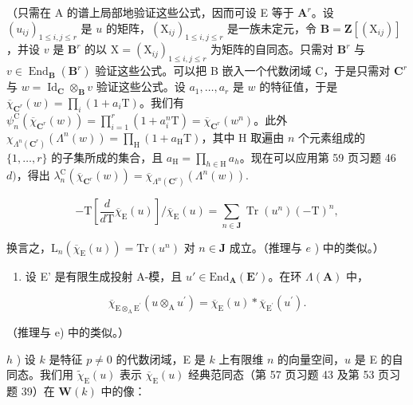 （只需在 A 的谱上局部地验证这些公式，因而可设 E 等于 \(\mathbf{A}^r\)。设 \((u_{ij})_{1\leqslant i,j\leqslant r}\) 是 \(u\) 的矩阵，\((\mathrm{X}_{ij})_{1\leqslant i,j\leqslant r}\) 是一族未定元，令 \(\mathbf{B} = \mathbf{Z}[(\mathrm{X}_{ij})]\)，并设 \(v\) 是 \(\mathbf{B}^r\) 的以 \(\mathrm{X} = (\mathrm{X}_{ij})_{1\leqslant i,j\leqslant r}\) 为矩阵的自同态。只需对 \(\mathbf{B}^r\) 与 \(v\in \operatorname {End}_{\mathbf{B}}(\mathbf{B}^r)\) 验证这些公式。可以把 B 嵌入一个代数闭域 C，于是只需对 \(\mathbf{C}^r\) 与 \(w = \operatorname {Id}_{\mathbf{C}}\otimes_{\mathbf{B}}v\) 验证这些公式。设 \(a_1,\dots,a_r\) 是 \(w\) 的特征值，于是 \(\overline{\chi}_{\mathbf{C}^r}(w) = \prod_i(1 + a_i\mathrm{T})\)。我们有 \(\psi_n^{\mathrm{C}}(\overline{\chi}_{\mathbf{C}^r}(w)) = \prod_{i = 1}^{r}(1 + a_i^n\mathrm{T}) = \overline{\chi}_{\mathbf{C}^r}(w^n)\)。此外 \(\chi_{\Lambda^n (\mathbf{C}^r)}(\Lambda^n (w)) = \prod_{\mathrm{H}}(1 + a_{\mathrm{H}}\mathrm{T})\)，其中 H 取遍由 \(n\) 个元素组成的 \(\{1,\dots,r\}\) 的子集所成的集合，且 \(a_{\mathrm{H}} = \prod_{h\in \mathrm{H}}a_h\)。现在可以应用第 59 页习题 46 \(d)\)，得出 \(\lambda_n^{\mathrm{C}}(\overline{\chi}_{\mathbf{C}^r}(w)) = \overline{\chi}_{\Lambda^{n}(\mathbf{C}^{r})}(\Lambda^{n}(w)).\)

\[
- \mathrm{T} \left[ \frac {d}{d \mathrm{T}} \overline {{{\chi}}} _ {\mathrm{E}} (u) \right] / \overline {{{\chi}}} _ {\mathrm{E}} (u) = \sum_ {n \in \mathbf {J}} \operatorname{Tr} (u ^ {n}) (- \mathrm{T}) ^ {n},
\]

换言之，\(\mathrm{L}_n(\overline{\chi}_{\mathrm{E}}(u)) = \mathrm{Tr}(u^n)\) 对 \(n \in \mathbf{J}\) 成立。（推理与 \(e\) ) 中的类似。）

\begin{enumerate}
\def\labelenumi{\alph{enumi})}
\setcounter{enumi}{6}
\tightlist
\item
  设 E' 是有限生成投射 A-模，且 \(u' \in \mathrm{End}_{\mathbf{A}}(\mathbf{E}')\)。在环 \(\Lambda(\mathbf{A})\) 中，
\end{enumerate}

\[
\overline {{{{\chi}}}} _ {\mathrm{E} \otimes_ {\mathrm{A}} \mathrm{E} ^ {\prime}} (u \otimes_ {\mathrm{A}} u ^ {\prime}) = \overline {{{{\chi}}}} _ {\mathrm{E}} (u) * \overline {{{{\chi}}}} _ {\mathrm{E} ^ {\prime}} (u ^ {\prime}).
\]

（推理与 e) 中的类似。）

\(h\) ) 设 \(k\) 是特征 \(p\ne0\) 的代数闭域，E 是 \(k\) 上有限维 \(n\) 的向量空间，\(u\) 是 E 的自同态。我们用 \(\tilde{\chi}_{\mathrm{E}}(u)\) 表示 \(\overline{\chi}_{\mathrm{E}}(u)\) 经典范同态（第 57 页习题 43 及第 53 页习题 39）在 \(\mathbf{W}(k)\) 中的像：

